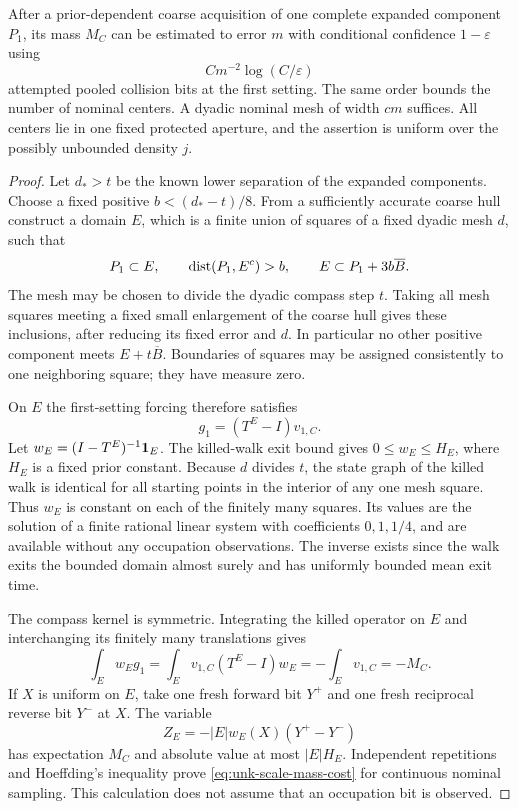 \begin{proposition}
\label{prop:unk-scale-mass}
After a prior-dependent coarse acquisition of one complete expanded
component $P_1$, its mass $M_C$ can be estimated to error $m$ with
conditional confidence $1-\varepsilon$ using
\begin{equation}\label{eq:unk-scale-mass-cost}
                       C m^{-2}\log(C/\varepsilon)
\end{equation}
attempted pooled collision bits at the first setting. The same order
bounds the number of nominal centers. A dyadic nominal mesh of width
$c m$ suffices. All centers lie in one fixed protected aperture, and
the assertion is uniform over the possibly unbounded density $j$.
\end{proposition}
\begin{proof}
Let $d_*>t$ be the known lower separation of the expanded components.
Choose a fixed positive $b<(d_*-t)/8$. From a sufficiently accurate
coarse hull construct a domain $E$, which is a finite union of squares
of a fixed dyadic mesh $d$, such that
\begin{equation}\label{eq:unk-scale-domain}
 P_1\subset E,\qquad
 \operatorname{dist}(P_1,E^c)>b,\qquad E\subset P_1+3b\overline B.
\end{equation}
The mesh may be chosen to divide the dyadic compass step $t$.
Taking all mesh squares meeting a fixed small enlargement of the
coarse hull gives these inclusions, after reducing its fixed error
and $d$. In particular no other positive component meets
$E+t\overline B$. Boundaries of squares may be assigned consistently
to one neighboring square; they have measure zero.

On $E$ the first-setting forcing therefore satisfies
\[
             g_1=(T^E-I)v_{1,C}.
\]
Let $w_E=(I-T^E)^{-1}\mathbf 1_E$. The killed-walk exit bound gives
$0\le w_E\le H_E$, where $H_E$ is a fixed prior constant. Because
$d$ divides $t$, the state graph of the killed walk is identical for
all starting points in the interior of any one mesh square. Thus
$w_E$ is constant on each of the finitely many squares. Its values
are the solution of a finite rational linear system with coefficients
$0,1,1/4$, and are available without any occupation observations.
The inverse exists since the walk exits the bounded domain almost
surely and has uniformly bounded mean exit time.

The compass kernel is symmetric. Integrating the killed operator on
$E$ and interchanging its finitely many translations gives
\begin{equation}\label{eq:unk-scale-duality}
 \int_E w_E g_1
   =\int_E v_{1,C}(T^E-I)w_E
   =-\int_Ev_{1,C}=-M_C.
\end{equation}
If $X$ is uniform on $E$, take one fresh forward bit $Y^+$ and one
fresh reciprocal reverse bit $Y^-$ at $X$. The variable
\[
            Z_E=-|E|w_E(X)(Y^+-Y^-)
\]
has expectation $M_C$ and absolute value at most $|E|H_E$. Independent
repetitions and Hoeffding's inequality prove
\eqref{eq:unk-scale-mass-cost} for continuous nominal sampling.
This calculation does not assume that an occupation bit is observed.


\end{proof}
